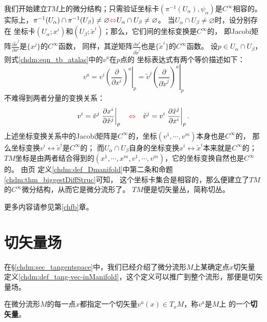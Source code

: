 我们开始建立$TM$上的微分结构；只需验证坐标卡$(\pi^{-1} (U_\alpha),\psi_\alpha)$是$C^\infty$相容的。
实际上，$\pi^{-1} (U_\alpha) \cap \pi^{-1} (U_\beta) \neq \varnothing {\color{red}\Leftrightarrow}
U_\alpha \cap U_\beta \neq \varnothing$。
当$U_\alpha \cap U_\beta \neq \varnothing$时，设分别存在
坐标卡$(U_\alpha;x^i)$和$(U_\beta;\tilde{x}^i)$；那么，它们间的坐标变换是$C^\infty$的，
即Jacobi矩阵$\frac{\partial \tilde{x}^j}{\partial {x}^i}$是$\{x^j\}$的$C^\infty$函数，
同样，其逆矩阵$\frac{\partial {x}^i}{\partial \tilde{x}^j}$也是$\{\tilde{x}^i\}$的$C^\infty$函数。
设$p \in U_\alpha \cap U_\beta$，则式\eqref{chdm:eqn_tb_atalas}中的$v^a$在$p$点的
坐标表达式有两个等价描述如下：
\begin{equation}
    v^a = v^i \left. \left(\frac{\partial }{\partial x^i}\right)^a \right | _p
        = \tilde{v}^j \left. \left(\frac{\partial }{\partial \tilde{x}^j}\right)^a  \right | _p
\end{equation}
不难得到两者分量的变换关系：
\begin{equation}\label{chdm:eqn_tbv}
    v^i = \tilde{v}^j \left. \frac{\partial {x}^i}{\partial \tilde{x}^j}  \right | _p
    {\quad \color{red}\Leftrightarrow \quad}
    \tilde{v}^j = {v}^i \left. \frac{\partial \tilde{x}^j}{\partial {x}^i}  \right | _p .
\end{equation}
上述坐标变换关系中的Jacobi矩阵是$C^\infty$的，坐标$(v^1,\cdots,v^m)$本身也是$C^\infty$的，
那么坐标变换$v^i \leftrightarrow \tilde{v}^i$是$C^\infty$的；
而$U_\alpha \cap U_\beta$自身的坐标变换$x^i \leftrightarrow \tilde{x}^i$本来就是$C^\infty$的；
$TM$坐标是由两者结合得到的$(x^1,\cdots,x^m,v^1,\cdots,v^m)$，它的坐标变换自然也是$C^\infty$的。
由\pageref{chdm:def_Dmanifold}页
定义\ref{chdm:def_Dmanifold}中第二条和命题\ref{chdm:thm_biggestDiffStruc}可知，
这个坐标卡集合是{\kaishu 相容的}，那么便建立了$TM$的$C^\infty$微分结构，从而它是微分流形了。
$TM$便是切矢量丛，简称切丛。

更多内容请参见第\ref{chfb}章。



\section{切矢量场}\label{chdm:sec_tangent-vector-field}
在\S\ref{chdm:sec_tangentspace}中，我们已经介绍了微分流形$M$上某确定点$x$切矢量
定义\ref{chdm:def_tang-vec-inManifold}，这个定义可以推广到整个流形，那便是切矢量场。
\begin{definition}\label{chdm:def_tangent-vector-field}
    在微分流形$M$的每一点$x$都指定一个切矢量$v^a(x)\in T_xM$，称$v^a$是$M$上
    的一个\textbf{切矢量}。
\end{definition}


